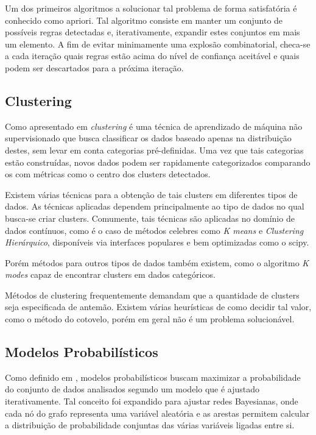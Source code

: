 Um dos primeiros algoritmos a solucionar tal problema de forma satisfatória é
conhecido como apriori\cite{minig_association_rules}. Tal algoritmo consiste em
manter um conjunto de possíveis regras detectadas e, iterativamente, expandir
estes conjuntos em mais um elemento. A fim de evitar minimamente uma explosão
combinatorial, checa-se a cada iteração quais regras estão acima do nível de
confiança aceitável e quais podem ser descartados para a próxima iteração.

\subsection{Clustering}

Como apresentado em
\cite{recommender_system_software_engineering_nearest_neighbours}
\textit{clustering} é uma técnica de aprendizado de máquina não supervisionado
que busca classificar os dados baseado apenas na distribuição destes, sem levar
em conta categorias pré-definidas. Uma vez que tais categorias estão
construídas, novos dados podem ser rapidamente categorizados comparando os com
métricas como o centro dos clusters detectados.

Existem várias técnicas para a obtenção de tais clusters em diferentes tipos de
dados. As técnicas aplicadas dependem principalmente ao tipo de dados no qual
busca-se criar clusters. Comumente, tais técnicas são aplicadas no domínio de
dados contínuos, como é o caso de métodos celebres como \textit{K means} e
\textit{Clustering Hierárquico}, disponíveis via interfaces populares e bem
optimizadas como o scipy\cite{scikit_clustering_docs}.

Porém métodos para outros tipos de dados também existem, como o algoritmo
\textit{K modes}\cite{k_modes_article} capaz de encontrar clusters em dados
categóricos.  

Métodos de clustering frequentemente demandam que a quantidade de clusters seja
especificada de antemão. Existem várias heurísticas de como decidir tal valor,
como o método do cotovelo\cite{elbow}, porém em geral não é um problema
solucionável.

\subsection{Modelos Probabilísticos}
Como definido em
\cite{maximum_likelihood_from_incomplete_data_via_the_em_algorithm}, modelos
probabilísticos buscam maximizar a probabilidade do conjunto de dados analisados
segundo um modelo que é ajustado iterativamente. Tal conceito foi expandido para
ajustar redes Bayesianas\cite{bayesian_network}, onde cada nó do grafo
representa uma variável aleatória e as arestas permitem calcular a distribuição
de probabilidade conjuntas das várias variáveis ligadas entre si.

